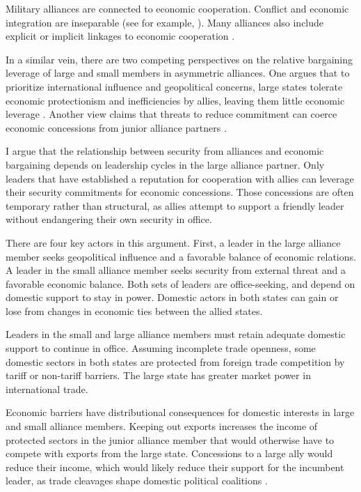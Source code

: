 \documentclass[12pt]{article}
\begin{document}
Military alliances are connected to economic cooperation.
Conflict and economic integration are inseparable (see for example, \citep{GartzkeLi2003, Chen2021}).
Many alliances also include explicit or implicit linkages to economic cooperation \citep{LongLeeds2006, Davis2008, Poast2012}. 


In a similar vein, there are two competing perspectives on the relative bargaining leverage of large and small members in asymmetric alliances.
One argues that to prioritize international influence and geopolitical concerns, large states tolerate economic protectionism and inefficiencies by allies, leaving them little economic leverage \citep{Drezner2013, WolfordKim2017}. 
Another view claims that threats to reduce commitment can coerce economic concessions from junior alliance partners \citep{Oatley2015}.  


I argue that the relationship between security from alliances and economic bargaining depends on leadership cycles in the large alliance partner.  
Only leaders that have established a reputation for cooperation with allies can leverage their security commitments for economic concessions. 
Those concessions are often temporary rather than structural, as allies attempt to support a friendly leader without endangering their own security in office. 


There are four key actors in this argument. 
First, a leader in the large alliance member seeks geopolitical influence and a favorable balance of economic relations. 
A leader in the small alliance member seeks security from external threat and a favorable economic balance.
Both sets of leaders are office-seeking, and depend on domestic support to stay in power.
Domestic actors in both states can gain or lose from changes in economic ties between the allied states. 


Leaders in the small and large alliance members must retain adequate domestic support to continue in office. 
Assuming incomplete trade openness, some domestic sectors in both states are protected from foreign trade competition by tariff or non-tariff barriers. 
The large state has greater market power in international trade. 


Economic barriers have distributional consequences for domestic interests in large and small alliance members.
Keeping out exports increases the income of protected sectors in the junior alliance member that would otherwise have to compete with exports from the large state.
Concessions to a large ally would reduce their income, which would likely reduce their support for the incumbent leader, as trade cleavages shape domestic political coalitions \citep{Rogowski1987, Hiscox2001}. 
\end{document}
